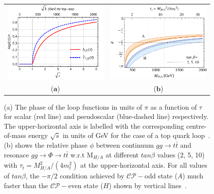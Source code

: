\begin{figure}[htp]
\centering
\begin{tabular}{cc}
\hspace{-0.3cm}
\includegraphics[scale=0.6]{fig/sm_beyond/loop_function_phase.pdf}
& \hspace{-0.4cm} \includegraphics[scale=0.603]{fig/sm_beyond/fig_phase_A_H.pdf}\\
  \qquad ($\mathbf{a}$)\qquad\qquad&($\mathbf{b}$) \\
\end{tabular}
\caption{(a) The phase of the loop functions in units of $\pi$ as a function of $\tau$ for scalar (red line) and pseudoscalar (blue-dashed line) respectively. The upper-horizontal axis is labelled with the corresponding centre-of-mass energy $\sqrt{\hat{s}}$ in units of GeV for the case of a top quark loop~\cite{Carena:2016npr}. (b) shows the relative phase $\phi$ between continuum $gg\rightarrow t\bar{t}$ and resonace $gg\rightarrow \Phi \rightarrow t\bar{t}$ w.r.t M$_{H/A}$ at different $tan\beta$ values (2, 5, 10) with $\tau_{t} = M^{2}_{H/A}/(4m_{t}^{2})$ at the upper-horizontal axis. For all values of $tan\beta$, the $-\pi/2$ condition achieved by $\mathcal{CP}-$odd state ($A$) much faster than the $\mathcal{CP}-$even state ($H$) shown by vertical lines~\cite{Jung:2015gta}. }\label{fig:loop_function_phase}
\end{figure}
